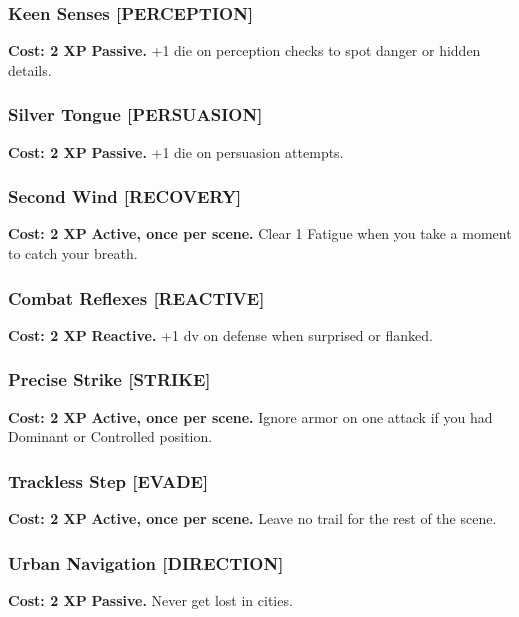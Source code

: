 \subsubsection*{Keen Senses \textnormal{[PERCEPTION]}}
\label{talent:keen-senses}
\textbf{Cost: 2 XP} \textbf{Passive.} +1 die on perception checks to spot danger or hidden details.

\subsubsection*{Silver Tongue \textnormal{[PERSUASION]}}
\label{talent:silver-tongue}
\textbf{Cost: 2 XP} \textbf{Passive.} +1 die on persuasion attempts.

\subsubsection*{Second Wind \textnormal{[RECOVERY]}}
\label{talent:second-wind}
\textbf{Cost: 2 XP} \textbf{Active, once per scene.} Clear 1 Fatigue when you take a moment to catch your breath.

\subsubsection*{Combat Reflexes \textnormal{[REACTIVE]}}
\label{talent:combat-reflexes}
\textbf{Cost: 2 XP} \textbf{Reactive.} +1 dv on defense when surprised or flanked.

\subsubsection*{Precise Strike \textnormal{[STRIKE]}}
\label{talent:precise-strike}
\textbf{Cost: 2 XP} \textbf{Active, once per scene.} Ignore armor on one attack if you had Dominant or Controlled position.

\subsubsection*{Trackless Step \textnormal{[EVADE]}}
\label{talent:trackless-step}
\textbf{Cost: 2 XP} \textbf{Active, once per scene.} Leave no trail for the rest of the scene.

\subsubsection*{Urban Navigation \textnormal{[DIRECTION]}}
\label{talent:urban-navigation}
\textbf{Cost: 2 XP} \textbf{Passive.} Never get lost in cities.

